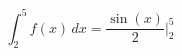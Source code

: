 \documentclass{Article}
\begin{document}
\[
\int_{2}^{5}f(x)\,dx=\frac{\sin(x)}{2}\Big|_{2}^5
\]
\end{document}
